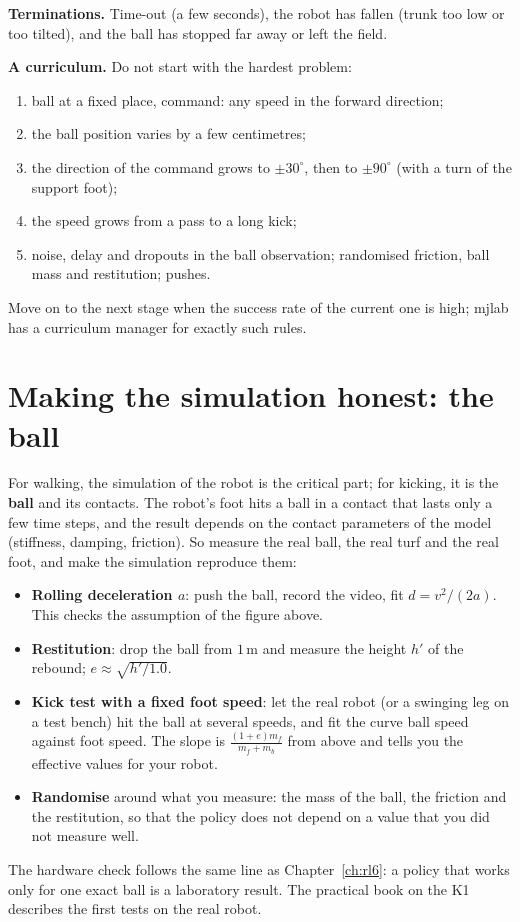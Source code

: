 \textbf{Terminations.} Time-out (a few seconds), the robot has fallen (trunk too low or too tilted), and the ball has stopped far away or left the field.

\textbf{A curriculum.} Do not start with the hardest problem:
\begin{enumerate}[nosep]
 \item ball at a fixed place, command: any speed in the forward direction;
 \item the ball position varies by a few centimetres;
 \item the direction of the command grows to $\pm30^{\circ}$, then to $\pm90^{\circ}$ (with a turn of the support foot);
 \item the speed grows from a pass to a long kick;
 \item noise, delay and dropouts in the ball observation; randomised friction, ball mass and restitution; pushes.
\end{enumerate}
Move on to the next stage when the success rate of the current one is high; mjlab has a curriculum manager for exactly such rules.

\section*{Making the simulation honest: the ball}
For walking, the simulation of the robot is the critical part; for kicking, it is the \textbf{ball} and its contacts. The robot's foot hits a ball in a contact that lasts only a few time steps, and the result depends on the contact parameters of the model (stiffness, damping, friction). So measure the real ball, the real turf and the real foot, and make the simulation reproduce them:
\begin{itemize}[nosep]
 \item \textbf{Rolling deceleration $a$}: push the ball, record the video, fit $d=v^2/(2a)$. This checks the assumption of the figure above.
 \item \textbf{Restitution}: drop the ball from $1$\,m and measure the height $h'$ of the rebound; $e\approx\sqrt{h'/1.0}$.
 \item \textbf{Kick test with a fixed foot speed}: let the real robot (or a swinging leg on a test bench) hit the ball at several speeds, and fit the curve ball speed against foot speed. The slope is $\tfrac{(1+e)m_f}{m_f+m_b}$ from above and tells you the effective values for your robot.
 \item \textbf{Randomise} around what you measure: the mass of the ball, the friction and the restitution, so that the policy does not depend on a value that you did not measure well.
\end{itemize}
The hardware check follows the same line as Chapter~\ref{ch:rl6}: a policy that works only for one exact ball is a laboratory result. The practical book on the K1 describes the first tests on the real robot.

